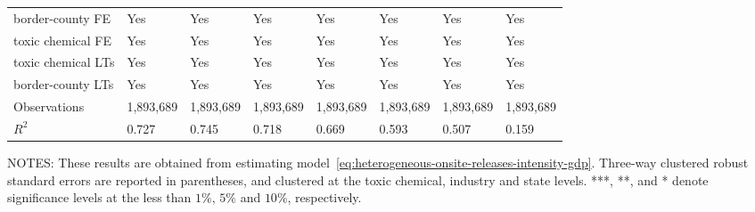 \begin{table}[H]
{\begin{tabular}{@{}llllllll@{}}
            border-county FE                & Yes       & Yes           & Yes       & Yes          & Yes             & Yes           & Yes                 \\
            toxic chemical FE               & Yes       & Yes           & Yes       & Yes          & Yes             & Yes           & Yes                 \\
            toxic chemical LTs              & Yes       & Yes           & Yes       & Yes          & Yes             & Yes           & Yes                 \\
            border-county LTs               & Yes       & Yes           & Yes       & Yes          & Yes             & Yes           & Yes                 \\\midrule
            Observations                    & 1,893,689 & 1,893,689     & 1,893,689 & 1,893,689    & 1,893,689       & 1,893,689     & 1,893,689           \\
            $R^2$                           & 0.727     & 0.745         & 0.718     & 0.669        & 0.593           & 0.507         & 0.159               \\ \bottomrule \bottomrule
        \end{tabular}%
    }
    \begin{minipage}{\columnwidth}
        \vspace{0.05in}
        \tiny NOTES: These results are obtained from estimating model~\ref{eq:heterogeneous-onsite-releases-intensity-gdp}. Three-way clustered robust standard errors are reported in parentheses, and clustered at the toxic chemical, industry and state levels. ***, **, and * denote significance levels at the less than $1\%$, $5\%$ and $10\%$, respectively.
    \end{minipage}
\end{table}